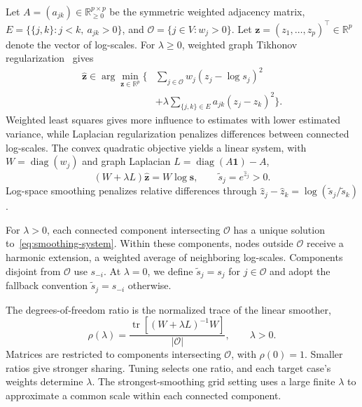 \documentclass[conference]{IEEEtran}
\begin{document}
Let $A=(a_{jk})\in\mathbb R_{\ge0}^{p\times p}$ be the symmetric weighted adjacency matrix, $E=\{\{j,k\}:j<k,\ a_{jk}>0\}$, and $\mathcal O=\{j\in V:w_j>0\}$. Let $\mathbf z=(z_1,\ldots,z_p)^\top\in\mathbb R^p$ denote the vector of log-scales. For $\lambda\geq0$, weighted graph Tikhonov regularization~\cite{shuman2013emerging} gives
\begin{equation}
\begin{aligned}
\hat{\mathbf z}\in\arg\min_{\mathbf z\in\mathbb R^p}\biggl\{&
\sum_{j\in\mathcal O}w_j(z_j-\log s_j)^2\\
&+\lambda\sum_{\{j,k\}\in E}a_{jk}(z_j-z_k)^2\biggr\}.
\end{aligned}
\label{eq:graph-smoothing}
\end{equation}
Weighted least squares gives more influence to estimates with lower estimated variance, while Laplacian regularization penalizes differences between connected log-scales. The convex quadratic objective yields a linear system, with $W=\operatorname{diag}(w_j)$ and graph Laplacian $L=\operatorname{diag}(A\mathbf 1)-A$,
\begin{equation}
(W+\lambda L)\hat{\mathbf z}=W\log\mathbf s,
\qquad \tilde s_j=e^{\hat z_j}>0.
\label{eq:smoothing-system}
\end{equation}
Log-space smoothing penalizes relative differences through $\hat z_j-\hat z_k=\log(\tilde s_j/\tilde s_k)$.

For $\lambda>0$, each connected component intersecting $\mathcal O$ has a unique solution to~\eqref{eq:smoothing-system}. Within these components, nodes outside $\mathcal O$ receive a harmonic extension, a weighted average of neighboring log-scales. Components disjoint from $\mathcal O$ use $s_{-i}$. At $\lambda=0$, we define $\tilde s_j=s_j$ for $j\in\mathcal O$ and adopt the fallback convention $\tilde s_j=s_{-i}$ otherwise.

The degrees-of-freedom ratio is the normalized trace of the linear smoother,
\begin{equation}
\rho(\lambda)=\frac{\operatorname{tr}[(W+\lambda L)^{-1}W]}{|\mathcal O|},
\qquad \lambda>0.
\label{eq:smoothing-ratio}
\end{equation}
Matrices are restricted to components intersecting $\mathcal O$, with $\rho(0)=1$. Smaller ratios give stronger sharing. Tuning selects one ratio, and each target case's weights determine $\lambda$. The strongest-smoothing grid setting uses a large finite $\lambda$ to approximate a common scale within each connected component.
\end{document}
